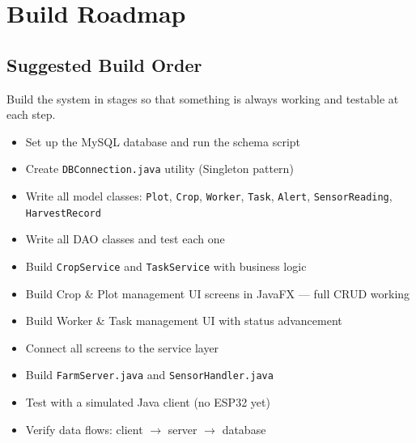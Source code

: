 \documentclass[12pt, a4paper]{report}
\begin{document}
\chapter{Build Roadmap}

\section{Suggested Build Order}

Build the system in stages so that something is always working and testable at each step.

\begin{tcolorbox}[infobox, title={Stage 1 --- Foundation (Day 1)}]
\begin{itemize}[noitemsep]
    \item Set up the MySQL database and run the schema script
    \item Create \texttt{DBConnection.java} utility (Singleton pattern)
    \item Write all model classes: \texttt{Plot}, \texttt{Crop}, \texttt{Worker}, \texttt{Task}, \texttt{Alert}, \texttt{SensorReading}, \texttt{HarvestRecord}
    \item Write all DAO classes and test each one
\end{itemize}
\end{tcolorbox}

\begin{tcolorbox}[infobox, title={Stage 2 --- Farm Management Core (Day 2-3)}]
\begin{itemize}[noitemsep]
    \item Build \texttt{CropService} and \texttt{TaskService} with business logic
    \item Build Crop \& Plot management UI screens in JavaFX --- full CRUD working
    \item Build Worker \& Task management UI with status advancement
    \item Connect all screens to the service layer
\end{itemize}
\end{tcolorbox}

\begin{tcolorbox}[infobox, title={Stage 3 --- Networking \& IoT Pipeline (Day 4)}]
\begin{itemize}[noitemsep]
    \item Build \texttt{FarmServer.java} and \texttt{SensorHandler.java}
    \item Test with a simulated Java client (no ESP32 yet)
    \item Verify data flows: client $\rightarrow$ server $\rightarrow$ database
\end{itemize}
\end{tcolorbox}
\end{document}
